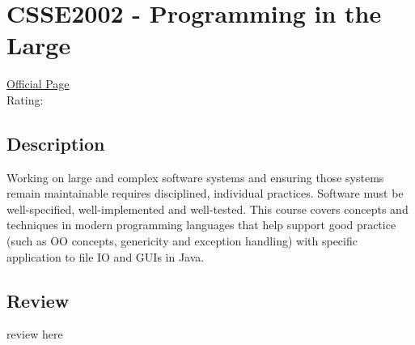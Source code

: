 \hypertarget{CSSE2002}{\section{CSSE2002 - Programming in the Large}}

\large
\textcolor{turbo_purple}{\href{https://my.uq.edu.au/programs-courses/course.html?course_code=CSSE2002}{Official Page}} \\
Rating: \cstar\cstar\cstar\cstar\ostar

\normalsize
\subsection*{Description}
Working on large and complex software systems and ensuring those systems remain maintainable requires disciplined, individual practices.
Software must be well-specified, well-implemented and well-tested.
This course covers concepts and techniques in modern programming languages that help support good practice (such as OO concepts, genericity and exception handling) with specific application to file IO and GUIs in Java.

\subsection*{Review}
review here
